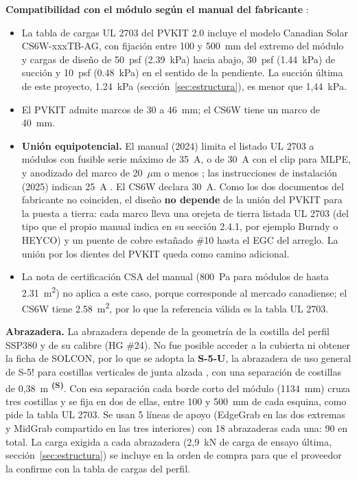 \documentclass[12pt]{article}
\newcommand{\supuesto}{\textsuperscript{\textcolor{orange!80!black}{\textbf{(S)}}}}
\begin{document}
\textbf{Compatibilidad con el módulo según el manual del fabricante} \cite{s5manual}:
\begin{itemize}
\item La tabla de cargas UL 2703 del PVKIT 2.0 incluye el modelo Canadian Solar CS6W-xxxTB-AG, con fijación entre 100 y 500~mm del extremo del módulo y cargas de diseño de 50~psf (\SI{2.39}{\kilo\pascal}) hacia abajo, 30~psf (\SI{1.44}{\kilo\pascal}) de succión y 10~psf (\SI{0.48}{\kilo\pascal}) en el sentido de la pendiente. La succión última de este proyecto, \SI{1.24}{\kilo\pascal} (sección~\ref{sec:estructura}), es menor que 1,44~kPa.
\item El PVKIT admite marcos de 30 a 46~mm; el CS6W tiene un marco de 40~mm.
\item \textbf{Unión equipotencial.} El manual (2024) limita el listado UL 2703 a módulos con fusible serie máximo de 35~A, o de 30~A con el clip para MLPE, y anodizado del marco de 20~$\mu$m o menos \cite{s5manual}; las instrucciones de instalación (2025) indican 25~A \cite{s5inst}. El CS6W declara 30~A. Como los dos documentos del fabricante no coinciden, el diseño \textbf{no depende} de la unión del PVKIT para la puesta a tierra: cada marco lleva una orejeta de tierra listada UL 2703 (del tipo que el propio manual indica en su sección 2.4.1, por ejemplo Burndy o HEYCO) y un puente de cobre estañado \#10 hasta el EGC del arreglo. La unión por los dientes del PVKIT queda como camino adicional.
\item La nota de certificación CSA del manual (800~Pa para módulos de hasta \SI{2.31}{\meter\squared}) no aplica a este caso, porque corresponde al mercado canadiense; el CS6W tiene \SI{2.58}{\meter\squared}, por lo que la referencia válida es la tabla UL 2703.
\end{itemize}

\textbf{Abrazadera.} La abrazadera depende de la geometría de la costilla del perfil SSP380 y de su calibre (HG \#24). No fue posible acceder a la cubierta ni obtener la ficha de SOLCON, por lo que se adopta la \textbf{S-5-U}, la abrazadera de uso general de S-5! para costillas verticales de junta alzada \cite{s5compat}, con una separación de costillas de 0,38~m \supuesto{}. Con esa separación cada borde corto del módulo (1134~mm) cruza tres costillas y se fija en dos de ellas, entre 100 y 500~mm de cada esquina, como pide la tabla UL 2703. Se usan 5 líneas de apoyo (EdgeGrab en las dos extremas y MidGrab compartido en las tres interiores) con 18 abrazaderas cada una: 90 en total. La carga exigida a cada abrazadera (2,9~kN de carga de ensayo última, sección~\ref{sec:estructura}) se incluye en la orden de compra para que el proveedor la confirme con la tabla de cargas del perfil.
\end{document}

